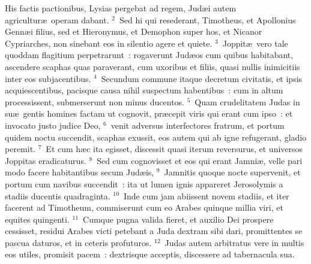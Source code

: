 \lettrine[lines=3,image=true,loversize=0.05,lraise=-0.03]{H}{}is factis pactionibus, Lysias pergebat ad regem, Jud\ae i autem agricultur\ae\ operam dabant.
${}^{2}$~Sed hi qui resederant, Timotheus, et Apollonius Genn\ae i filius, sed et Hieronymus, et Demophon super hos, et Nicanor Cypriarches, non sinebant eos in silentio agere et quiete.
${}^{3}$~Joppit\ae\ vero tale quoddam flagitium perpetrarunt~: rogaverunt Jud\ae os cum quibus habitabant, ascendere scaphas quas paraverant, cum uxoribus et filiis, quasi nullis inimicitiis inter eos subjacentibus.
${}^{4}$~Secundum commune itaque decretum civitatis, et ipsis acquiescentibus, pacisque causa nihil suspectum habentibus~: cum in altum processissent, submerserunt non minus ducentos.
${}^{5}$~Quam crudelitatem Judas in su\ae\ gentis homines factam ut cognovit, pr\ae cepit viris qui erant cum ipso~: et invocato justo judice Deo,
${}^{6}$~venit adversus interfectores fratrum, et portum quidem noctu succendit, scaphas exussit, eos autem qui ab igne refugerant, gladio peremit.
${}^{7}$~Et cum h\ae c ita egisset, discessit quasi iterum reversurus, et universos Joppitas eradicaturus.
${}^{8}$~Sed cum cognovisset et eos qui erant Jamni\ae , velle pari modo facere habitantibus secum Jud\ae is,
${}^{9}$~Jamnitis quoque nocte supervenit, et portum cum navibus succendit~: ita ut lumen ignis appareret Jerosolymis a stadiis ducentis quadraginta.
${}^{10}$~Inde cum jam abiissent novem stadiis, et iter facerent ad Timotheum, commiserunt cum eo Arabes quinque millia viri, et equites quingenti.
${}^{11}$~Cumque pugna valida fieret, et auxilio Dei prospere cessisset, residui Arabes victi petebant a Juda dextram sibi dari, promittentes se pascua daturos, et in ceteris profuturos.
${}^{12}$~Judas autem arbitratus vere in multis eos utiles, promisit pacem~: dextrisque acceptis, discessere ad tabernacula sua.


